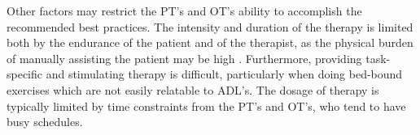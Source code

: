 \documentclass[12pt]{report}
\begin{document}
Other factors may restrict the PT's and OT's ability to accomplish the recommended best practices. The intensity and duration of the therapy is limited both by the endurance of the patient and of the therapist, as the physical burden of manually assisting the patient may be high \cite{Colombo}. Furthermore, providing task-specific and stimulating therapy is difficult, particularly when doing bed-bound exercises which are not easily relatable to ADL's. The dosage of therapy is typically limited by time constraints from the PT's and OT's, who tend to have busy schedules. 







\end{document}

